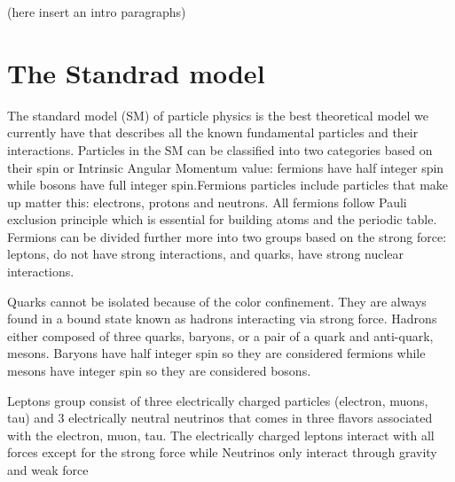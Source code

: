 (here insert an intro paragraphs) 



\section{The Standrad model}
The standard model (SM) of particle physics is the best theoretical model we currently have that describes all the known fundamental particles and their interactions. Particles in the SM can be classified into two categories based on their spin or Intrinsic Angular Momentum value: fermions have half integer spin while bosons have full integer spin.Fermions particles include particles that make up matter this: electrons, protons and neutrons. All fermions follow Pauli exclusion principle which is essential for building atoms and the periodic table. Fermions can be divided further more into two groups based on the strong force: leptons, do not have strong interactions, and quarks, have strong nuclear interactions. 
 
Quarks cannot be isolated because of the color confinement. They are always found in a bound state known as hadrons interacting via strong force. Hadrons either composed of three quarks, baryons, or a pair of a quark and anti-quark, mesons. Baryons have half integer spin so they are considered fermions while mesons have integer spin so they are considered bosons.

Leptons group consist of three electrically charged particles (electron, muons, tau) and 3 electrically neutral neutrinos that comes in three flavors associated with the electron, muon, tau. The electrically charged leptons interact with all forces except for the strong force while Neutrinos only interact through gravity and weak force

